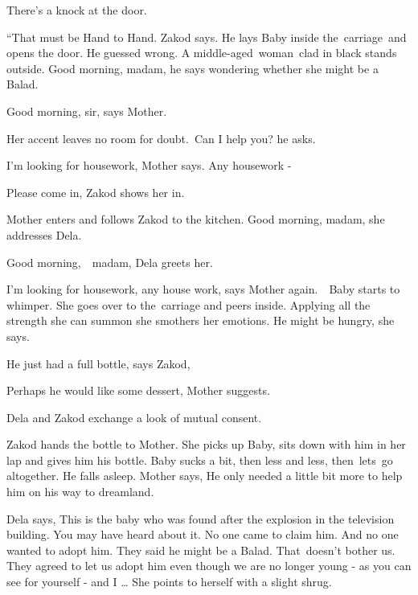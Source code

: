 \documentclass[letterpaper]{article}
\begin{document}
There's a knock at the door. 

{}``That must be Hand to Hand.{\textquotedbl} Zakod says. He lays Baby inside the\ carriage\  and opens the door. He
guessed wrong. A middle-aged\textcolor{red}{\ }woman\  clad in black stands outside. {\textquotedbl}Good morning,
madam,{\textquotedbl} he says wondering whether she might be a Balad.

{\textquotedbl}Good morning, sir,{\textquotedbl} says Mother. 

Her accent leaves no room for doubt.\ {\textquotedbl}Can I help you?{\textquotedbl} he asks.

{\textquotedbl}I'm looking for housework,{\textquotedbl} Mother says. {\textquotedbl}Any housework -{\textquotedbl} 

{\textquotedbl}Please come in,{\textquotedbl} Zakod shows her in. 

Mother enters and follows Zakod to the kitchen. {\textquotedbl}Good morning, madam,{\textquotedbl} she addresses Dela.

{\textquotedbl}Good morning,\ \ madam,{\textquotedbl} Dela greets her. 

{\textquotedbl}I'm looking for housework, any house work,{\textquotedbl} says Mother again.\ \ Baby starts to whimper.
She goes over to the~carriage and peers inside. Applying all the strength she can summon she smothers her emotions.
{\textquotedbl}He might be hungry,{\textquotedbl} she says.\ 

{\textquotedbl}He just had a full bottle,{\textquotedbl} says Zakod,

{\textquotedbl}Perhaps he would like some dessert,{\textquotedbl} Mother suggests.

Dela and Zakod exchange a look of mutual consent.

Zakod hands the bottle to Mother. She picks up Baby, sits down with him in her lap and gives him his bottle. Baby sucks
a bit, then less and less, then\ lets\ go altogether. He falls asleep. Mother says, {\textquotedbl}He only needed a
little bit more to help him on his way to dreamland.{\textquotedbl} 

Dela says, {\textquotedbl}This is the baby who was found after the explosion in the television building. You may have
heard about it. No one came to claim him. And no one wanted to adopt him. They said he might be a Balad. That~doesn't
bother us. They agreed to let us adopt him even though we are no longer young - as you can see for yourself - and I
{\dots}{\textquotedbl} She points to herself with a slight shrug.
\end{document}
